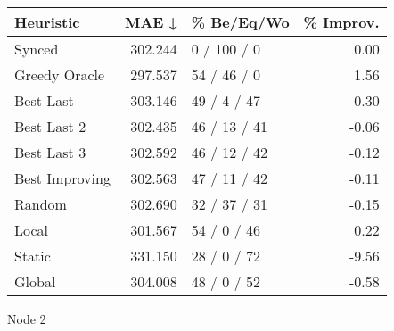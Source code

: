 \begin{tabular}{lrlr}
\toprule
\textbf{Heuristic} & \textbf{MAE ↓} & \textbf{\% Be/Eq/Wo} & \textbf{\% Improv.} \\
\midrule
            Synced &        302.244 &          0 / 100 / 0 &                0.00 \\
     Greedy Oracle &        297.537 &          54 / 46 / 0 &                1.56 \\
         Best Last &        303.146 &          49 / 4 / 47 &               -0.30 \\
       Best Last 2 &        302.435 &         46 / 13 / 41 &               -0.06 \\
       Best Last 3 &        302.592 &         46 / 12 / 42 &               -0.12 \\
    Best Improving &        302.563 &         47 / 11 / 42 &               -0.11 \\
            Random &        302.690 &         32 / 37 / 31 &               -0.15 \\
             Local &        301.567 &          54 / 0 / 46 &                0.22 \\
            Static &        331.150 &          28 / 0 / 72 &               -9.56 \\
            Global &        304.008 &          48 / 0 / 52 &               -0.58 \\
\bottomrule
\end{tabular}
\caption{Node 2}
\label{tab:non_lr05_le1_bs2_2}
